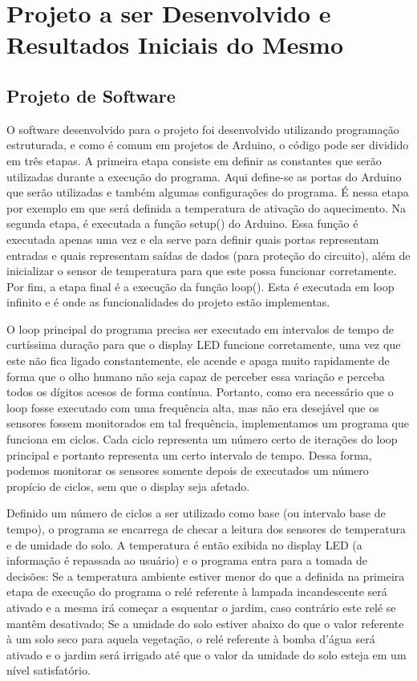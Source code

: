 \documentclass[a4paper,12pt]{article}
\begin{document}
\newpage
\section{Projeto a ser Desenvolvido e Resultados Iniciais do Mesmo}
\subsection{Projeto de Software}
O software desenvolvido para o projeto foi desenvolvido utilizando programação estruturada, e como é comum em projetos de Arduino, o código pode ser dividido em três etapas. A primeira etapa consiste em definir as constantes que serão utilizadas durante a execução do programa. Aqui define-se as portas do Arduino que serão utilizadas e também algumas configurações do programa. É nessa etapa por exemplo em que será definida a temperatura de ativação do aquecimento. Na segunda etapa, é executada a função setup() do Arduino. Essa função é executada apenas uma vez e ela serve para definir quais portas representam entradas e quais representam saídas de dados (para proteção do circuito), além de inicializar o sensor de temperatura para que este possa funcionar corretamente. Por fim, a etapa final é a execução da função loop(). Esta é executada em loop infinito e é onde as funcionalidades do projeto estão implementas.

    O loop principal do programa precisa ser executado em intervalos de tempo de curtíssima duração para que o display LED funcione corretamente, uma vez que este não fica ligado constantemente, ele acende e apaga muito rapidamente de forma que o olho humano não seja capaz de perceber essa variação e perceba todos os dígitos acesos de forma contínua. Portanto, como era necessário que o loop fosse executado com uma frequência alta, mas não era desejável que os sensores fossem monitorados em tal frequência, implementamos um programa que funciona em ciclos. Cada ciclo representa um número certo de iterações do loop principal e portanto representa um certo intervalo de tempo. Dessa forma, podemos monitorar os sensores somente depois de executados um número propício de ciclos, sem que o display seja afetado.
    
    Definido um número de ciclos a ser utilizado como base (ou intervalo base de tempo), o programa se encarrega de checar a leitura dos sensores de temperatura e de umidade do solo. A temperatura é então exibida no display LED (a informação é repassada ao usuário) e o programa entra para a tomada de decisões: Se a temperatura ambiente estiver menor do que a definida na primeira etapa de execução do programa o relé referente à lampada incandescente será ativado e a mesma irá começar a esquentar o jardim, caso contrário este relé se mantêm desativado; Se a umidade do solo estiver abaixo do que o valor referente à um solo seco para aquela vegetação, o relé referente à bomba d’água será ativado e o jardim será irrigado até que o valor da umidade do solo esteja em um nível satisfatório.
\end{document}
